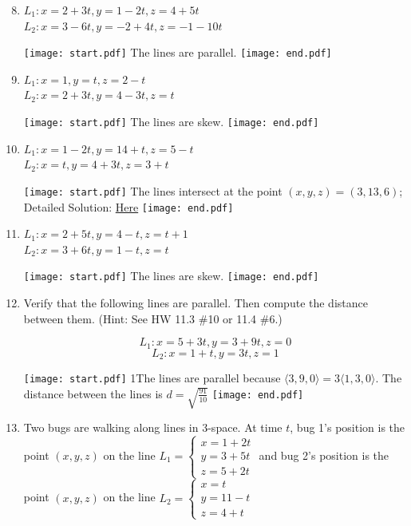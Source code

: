 \documentclass[12pt]{article}
\begin{document}
\begin{enumerate}
\setcounter{enumi}{7}

\item $L_1: x=2+3t, y=1-2t, z=4+5t$\\
$L_2: x=3-6t, y=-2+4t, z=-1-10t$

\texttt{[image: start.pdf]}
{{The lines are parallel.}}
\texttt{[image: end.pdf]}


\item $L_1: x=1, y=t, z=2-t$\\
$L_2: x=2+3t, y=4-3t, z=t$

\texttt{[image: start.pdf]}
{{The lines are skew.}}
\texttt{[image: end.pdf]}


\item $L_1: x=1-2t, y=14+t, z=5-t$\\
$L_2: x=t, y=4+3t, z=3+t$

\texttt{[image: start.pdf]}
{{The lines intersect at the point $(x,y,z)=(3,13,6)$; Detailed Solution: \textcolor{blue}{\href{http://www.math.drexel.edu/classes/Calculus/resources/Math200HW/Solutions/05_200_Lines_10.pdf}{Here}}}}
\texttt{[image: end.pdf]}


\item $L_1: x=2+5t, y=4-t, z=t+1$\\
$L_2: x=3+6t, y=1-t, z=t$

\texttt{[image: start.pdf]}
{{The lines are skew.}}
\texttt{[image: end.pdf]}


\item Verify that the following lines are parallel.  Then compute the distance between them. (Hint: See HW 11.3 \#10 or 11.4 \#6.)

$$L_1: x=5+3t, y=3+9t, z=0$$
$$L_2: x=1+t, y=3t, z=1$$

\texttt{[image: start.pdf]}
{{{1\linewidth}{The lines are parallel because $\langle 3,9,0\rangle=3\langle1,3,0\rangle$.  The distance between the lines is $d=\sqrt{\frac{91}{10}}$}}}
\texttt{[image: end.pdf]}


\item Two bugs are walking along lines in 3-space.  At time $t$, bug 1's position is the point $(x,y,z)$ on the line $L_1=\left\{\begin{array}{l}
x=1+2t\\
y=3+5t\\
z=5+2t\end{array}\right.$ and bug 2's position is the point $(x,y,z)$ on the line $L_2=\left\{\begin{array}{l}
x=t\\
y=11-t\\
z=4+t\end{array}\right.$


\end{enumerate}
\end{document}
